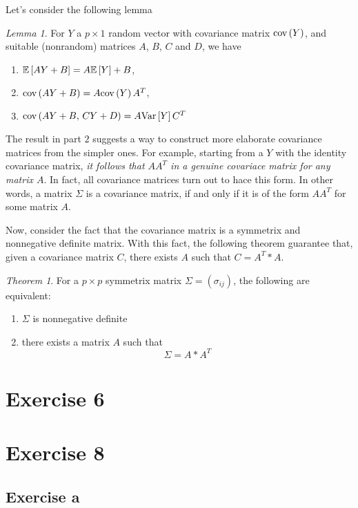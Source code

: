 \documentclass[11pt]{article}
\theoremstyle{definition}
\theoremstyle{remark}
\theoremstyle{remark}
\theoremstyle{remark}
\newtheorem{theorem}{Theorem}[section]
\theoremstyle{proof}
\newtheorem{lemma}{Lemma}
\begin{document}
Let's consider the following lemma

\begin{lemma}
  For $Y$ a $p \times 1$ random vector with covariance matrix $\cov{Y}$, and
  suitable (nonrandom) matrices $A$, $B$, $C$ and $D$, we have
\begin{enumerate}
  \item $\E{AY + B} = A\E{Y} +B$,
  \item $\cov{AY + B} = A\cov{Y}A^{T}$,
  \item $\cov{AY + B, \,CY + D} = A\V{Y}C^{T}$
\end{enumerate}
\end{lemma}

The result in part $2$ suggests a way to construct more elaborate covariance
matrices from the simpler ones. For example, starting from a $Y$ with the
identity covariance matrix, \textit{it follows that $AA^{T}$ in a genuine
  covariace matrix for any matrix $A$}. In fact, all covariance matrices turn
out to hace this form. In other words, a matrix $\Sigma$ is a covariance matrix,
if and only if it is of the form $AA^{T}$ for some matrix $A$.

Now, consider the fact that the covariance matrix is a symmetrix and nonnegative
definite matrix. With this fact, the following theorem guarantee that, given a
covariance matrix $C$, there exists $A$ such that $C = A^{T}*A$.

\begin{theorem}
  For a $p \times p$ symmetrix matrix $\Sigma = (\sigma_{ij})$, the following
  are equivalent:
\begin{enumerate}
  \item $\Sigma$ is nonnegative definite
  \item there exists a matrix $A$ such that
    \[
    \Sigma = A*A^{T}
    \]
\end{enumerate}
\end{theorem}

\section*{Exercise 6}

\section*{Exercise 8}
\subsection*{Exercise a}
\end{document}
